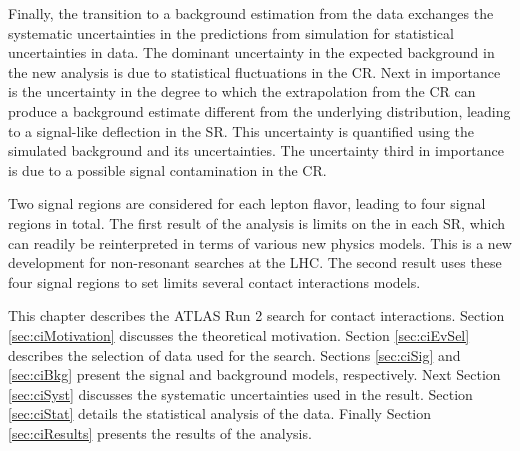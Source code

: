 Finally, the transition to a background estimation from the data exchanges the systematic uncertainties in the predictions from simulation for statistical uncertainties in data.
The dominant uncertainty in the expected background in the new analysis is due to statistical fluctuations in the CR.
Next in importance is the uncertainty in the degree to which the extrapolation from the CR can produce a background estimate different from the underlying distribution, leading to a signal-like deflection in the SR. This uncertainty is quantified using the simulated background and its uncertainties.
The uncertainty third in importance is due to a possible signal contamination in the CR.

Two signal regions are considered for each lepton flavor, leading to four signal regions in total.
The first result of the analysis is limits on the \xsbr in each SR, which can readily be reinterpreted in terms of various new physics models.
This is a new development for non-resonant searches at the LHC.
The second result uses these four signal regions to set limits several contact interactions models.

This chapter describes the ATLAS Run 2 search for contact interactions.
Section \ref{sec:ciMotivation} discusses the theoretical motivation.
Section \ref{sec:ciEvSel} describes the selection of data used for the search.
Sections \ref{sec:ciSig} and \ref{sec:ciBkg} present the signal and background models, respectively.
Next Section \ref{sec:ciSyst} discusses the systematic uncertainties used in the result.
Section \ref{sec:ciStat} details the statistical analysis of the data.
Finally Section \ref{sec:ciResults} presents the results of the analysis.










